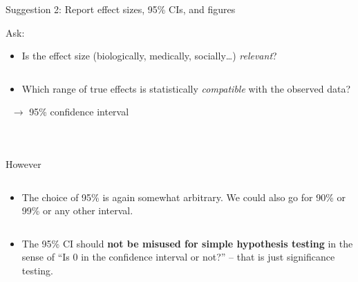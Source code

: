 \documentclass[
  10pt,
  ignorenonframetext,
]{beamer}
\providecommand{\tightlist}{%
  \setlength{\itemsep}{0pt}\setlength{\parskip}{0pt}}
\begin{document}
\begin{frame}
\begin{block}{Suggestion 2: Report effect sizes, 95\% CIs, and figures}
\protect\hypertarget{suggestion-2-report-effect-sizes-95-cis-and-figures}{}
\(~\)

Ask:

\vspace{2mm}

\begin{itemize}
\tightlist
\item
  Is the effect size (biologically, medically, socially\ldots)
  \emph{relevant}?
\end{itemize}

\(~\)

\begin{itemize}
\tightlist
\item
  Which range of true effects is statistically \emph{compatible} with
  the observed data?
\end{itemize}

\(~\) \centering \(\rightarrow\) 95\% confidence interval

\(~\)

\(~\)

\flushleft

\(~\)

\scriptsize

However

\(~\)

\begin{itemize}
\tightlist
\item
  The choice of 95\% is again somewhat arbitrary. We could also go for
  90\% or 99\% or any other interval.
\end{itemize}

\(~\)

\begin{itemize}
\tightlist
\item
  The 95\% CI should \textbf{not be misused for simple hypothesis
  testing} in the sense of ``Is 0 in the confidence interval or not?''
  -- that is just significance testing.
\end{itemize}
\end{block}
\end{frame}
\end{document}
